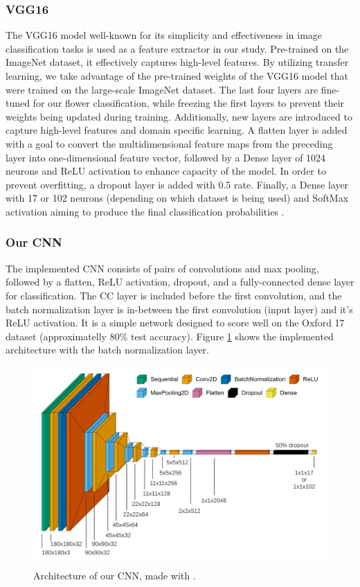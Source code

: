 \subsubsection{VGG16}

The VGG16 model well-known for its simplicity and effectiveness in image classification tasks \cite{SimonyanVGG} is used as a feature extractor in our study. Pre-trained on the ImageNet dataset, it effectively captures high-level features.
By utilizing transfer learning, we take advantage of the pre-trained weights of the VGG16 model that were trained on the large-scale ImageNet dataset.
The last four layers are fine-tuned for our flower classification, while freezing the first layers to prevent their weights being updated during training. Additionally, new layers are introduced to capture high-level features and domain specific learning.
A flatten layer is added with a goal to convert the multidimensional feature maps from the preceding layer into one-dimensional feature vector, followed by a Dense layer of 1024 neurons and ReLU activation to enhance capacity of the model.
In order to prevent overfitting, a dropout layer is added with 0.5 rate. Finally, a Dense layer with 17 or 102 neurons (depending on which dataset is being used) and SoftMax activation aiming to produce the final classification probabilities \cite{kaggle_flower_cnn}.

\subsubsection{Our CNN}

The implemented \gls{CNN} consists of pairs of convolutions and max pooling, followed by a flatten, ReLU activation, dropout, and a fully-connected dense layer for classification.
The \gls{CC} layer is included before the first convolution, and the batch normalization layer is in-between the first convolution (input layer) and it's ReLU activation.
It is a simple network designed to score well on the Oxford 17 dataset (approximatelly $80\%$ test accuracy). Figure \ref{fig:our_cnn} shows the implemented architecture with the batch normalization layer.


\begin{figure}[ht]
    \centering
    \includegraphics[width=\textwidth]{images/ours_architecture.png}
    \caption{Architecture of our CNN, made with \cite{Gavrikov2020VisualKeras}.}
    \label{fig:our_cnn}
\end{figure}